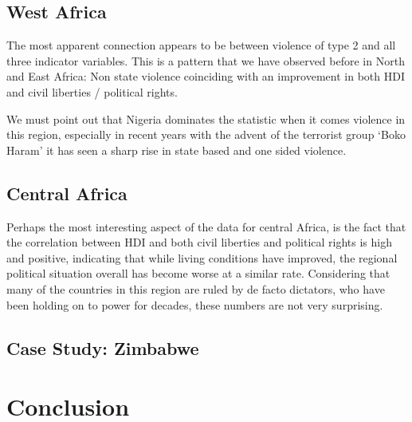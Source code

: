 \documentclass[a4paper,11pt]{article}
\begin{document}
\subsection{West Africa}
The most apparent connection appears to be between violence of type 2 and all three indicator variables. This is a pattern that we have observed before in North and East Africa: Non state violence coinciding with an improvement in both HDI and civil liberties / political rights. 

We must point out that Nigeria dominates the statistic when it comes violence in this region, especially in recent years with the advent of the terrorist group `Boko Haram' it has seen a sharp rise in state based and one sided violence.

\subsection{Central Africa}
Perhaps the most interesting aspect of the data for central Africa, is the fact that the correlation between HDI and both civil liberties and political rights is high and positive, indicating that while living conditions have improved, the regional political situation overall has become worse at a similar rate. Considering that many of the countries in this region are ruled by de facto dictators, who have been holding on to power for decades, these numbers are not very surprising.

\subsection{Case Study: Zimbabwe}

\section{Conclusion}

\end{document}

